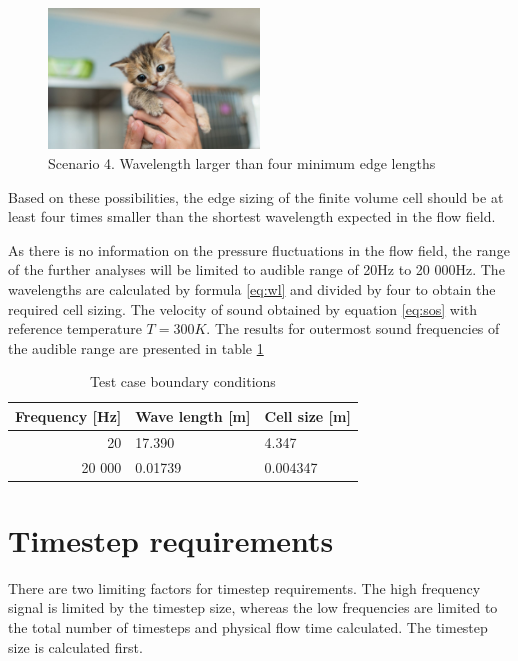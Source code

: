 \begin{figure}[h!]
\centering %
\includegraphics[width=0.5\textwidth]{Pictures/kitten-placeholder.jpg}
\caption{Scenario 4. Wavelength larger than four minimum edge lengths}
\label{scen4}
\end{figure}

Based on these possibilities, the edge sizing of the finite volume cell should be at least four times smaller than the shortest wavelength expected in the flow field.

As there is no information on the pressure fluctuations in the flow field, the range of the further analyses will be limited to audible range of 20Hz to 20 000Hz. The wavelengths are calculated by formula \ref{eq:wl} and divided by four to obtain the required cell sizing. The velocity of sound obtained by equation \ref{eq:sos} with reference temperature $T = 300K$. The results for outermost sound frequencies of the audible range are presented in table \ref{tab:meshsize}

\begin{table}[htb!]
\centering
\caption{Test case boundary conditions} \label{tab:meshsize}
\begin{tabular}{ | r | l | l | } \hline
Frequency [Hz] & Wave length [m] & Cell size [m] \\ \hline \hline
20 & 17.390 & 4.347  \\ \hline
20 000 & 0.01739 & 0.004347 \\ \hline
\end{tabular}
\end{table}

\section{Timestep requirements} \label{timestepsize}
There are two limiting factors for timestep requirements. The high frequency signal is limited by the timestep size, whereas the low frequencies are limited to the total number of timesteps and physical flow time calculated. The timestep size is calculated first.

